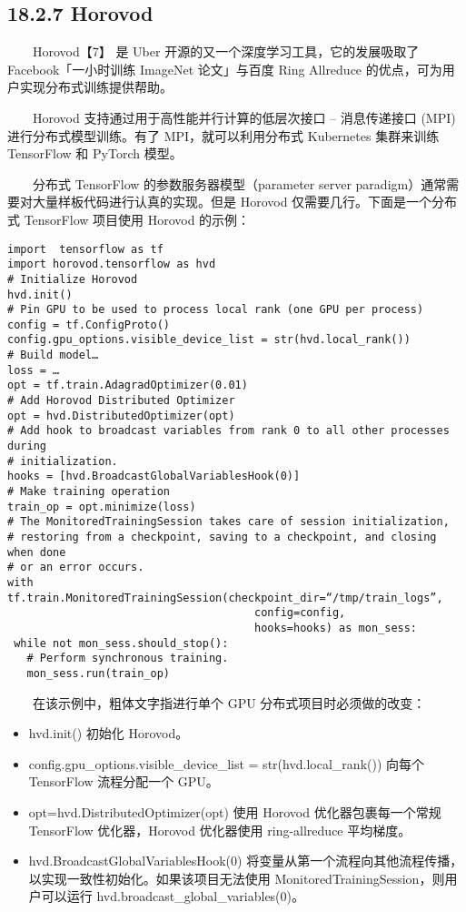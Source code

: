 \subsection{18.2.7 Horovod}\label{horovod}

  Horovod【7】 是 Uber 开源的又一个深度学习工具，它的发展吸取了
Facebook「一小时训练 ImageNet 论文」与百度 Ring Allreduce
的优点，可为用户实现分布式训练提供帮助。

  Horovod 支持通过用于高性能并行计算的低层次接口 -- 消息传递接口 (MPI)
进行分布式模型训练。有了 MPI，就可以利用分布式 Kubernetes 集群来训练
TensorFlow 和 PyTorch 模型。

  分布式 TensorFlow 的参数服务器模型（parameter server
paradigm）通常需要对大量样板代码进行认真的实现。但是 Horovod
仅需要几行。下面是一个分布式 TensorFlow 项目使用 Horovod 的示例：

\begin{verbatim}
import  tensorflow as tf
import horovod.tensorflow as hvd
# Initialize Horovod
hvd.init()
# Pin GPU to be used to process local rank (one GPU per process)
config = tf.ConfigProto()
config.gpu_options.visible_device_list = str(hvd.local_rank())
# Build model…
loss = …
opt = tf.train.AdagradOptimizer(0.01)
# Add Horovod Distributed Optimizer
opt = hvd.DistributedOptimizer(opt)
# Add hook to broadcast variables from rank 0 to all other processes during
# initialization.
hooks = [hvd.BroadcastGlobalVariablesHook(0)]
# Make training operation
train_op = opt.minimize(loss)
# The MonitoredTrainingSession takes care of session initialization,
# restoring from a checkpoint, saving to a checkpoint, and closing when done
# or an error occurs.
with tf.train.MonitoredTrainingSession(checkpoint_dir=“/tmp/train_logs”,
                                      config=config,
                                      hooks=hooks) as mon_sess:
 while not mon_sess.should_stop():
   # Perform synchronous training.
   mon_sess.run(train_op)
\end{verbatim}

  在该示例中，粗体文字指进行单个 GPU 分布式项目时必须做的改变：

\begin{itemize}
\item
  hvd.init() 初始化 Horovod。
\item
  config.gpu\_options.visible\_device\_list = str(hvd.local\_rank())
  向每个 TensorFlow 流程分配一个 GPU。
\item
  opt=hvd.DistributedOptimizer(opt) 使用 Horovod 优化器包裹每一个常规
  TensorFlow 优化器，Horovod 优化器使用 ring-allreduce 平均梯度。
\item
  hvd.BroadcastGlobalVariablesHook(0)
  将变量从第一个流程向其他流程传播，以实现一致性初始化。如果该项目无法使用
  MonitoredTrainingSession，则用户可以运行
  hvd.broadcast\_global\_variables(0)。
\end{itemize}

